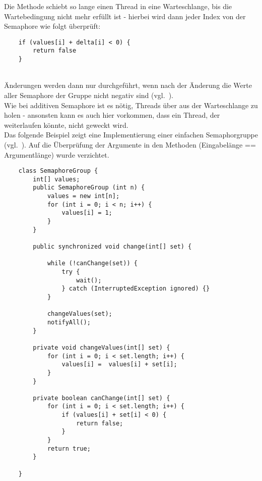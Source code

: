 \noindent
Die Methode schiebt so lange einen Thread in eine Warteschlange, bis die Wartebedingung nicht mehr erfüllt ist - hierbei wird dann jeder Index von der Semaphore wie folgt überprüft:


\begin{verbatim}
    if (values[i] + delta[i] < 0) {
        return false
    }
\end{verbatim}\\

\noindent
Änderungen werden dann nur durchgeführt, wenn nach der Änderung die Werte aller Semaphore der Gruppe nicht negativ sind (vgl.~\cite[109]{Oec22}).\\

\noindent
Wie bei additiven Semaphore ist es nötig, Threads über  aus der Warteschlange zu holen - ansonsten kann es auch hier vorkommen, dass ein Thread, der weiterlaufen könnte, nicht geweckt wird.\\

\noindent
Das folgende Beispiel zeigt eine Implementierung einer einfachen Semaphorgruppe (vgl.~\cite[110, Listing 3.5]{Oec22}).
Auf die Überprüfung der Argumente in den Methoden (Eingabelänge == Argumentlänge) wurde verzichtet.

\newpage
\begin{verbatim}
    class SemaphoreGroup {
        int[] values;
        public SemaphoreGroup (int n) {
            values = new int[n];
            for (int i = 0; i < n; i++) {
                values[i] = 1;
            }
        }

        public synchronized void change(int[] set) {

            while (!canChange(set)) {
                try {
                    wait();
                } catch (InterruptedException ignored) {}
            }

            changeValues(set);
            notifyAll();
        }

        private void changeValues(int[] set) {
            for (int i = 0; i < set.length; i++) {
                values[i] =  values[i] + set[i];
            }
        }

        private boolean canChange(int[] set) {
            for (int i = 0; i < set.length; i++) {
                if (values[i] + set[i] < 0) {
                    return false;
                }
            }
            return true;
        }

    }
\end{verbatim}
